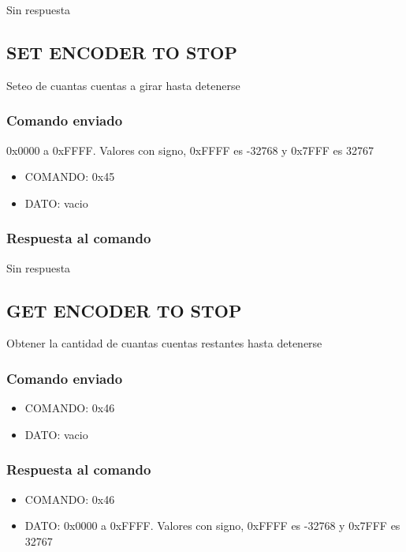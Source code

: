 \documentclass[a4paper,10pt]{article}
\begin{document}
Sin respuesta

\subsection{SET ENCODER TO STOP}
\label{set_encoder_to_stop}

Seteo de cuantas cuentas a girar hasta detenerse

\subsubsection*{Comando enviado}

0x0000 a 0xFFFF. Valores con signo, 0xFFFF es -32768 y 0x7FFF es 32767

\begin{itemize}
	\item{COMANDO:} 0x45
	\item{DATO:} vacio
\end{itemize}

\subsubsection*{Respuesta al comando}

Sin respuesta

\subsection{GET ENCODER TO STOP}
\label{get_encoder_to_stop}

Obtener la cantidad de cuantas cuentas restantes hasta detenerse

\subsubsection*{Comando enviado}

\begin{itemize}
	\item{COMANDO:} 0x46
	\item{DATO:} vacio
\end{itemize}

\subsubsection*{Respuesta al comando}

\begin{itemize}
	\item{COMANDO:} 0x46
	\item{DATO:} 0x0000 a 0xFFFF. Valores con signo, 0xFFFF es -32768 y 0x7FFF es 32767
\end{itemize}
\end{document}
